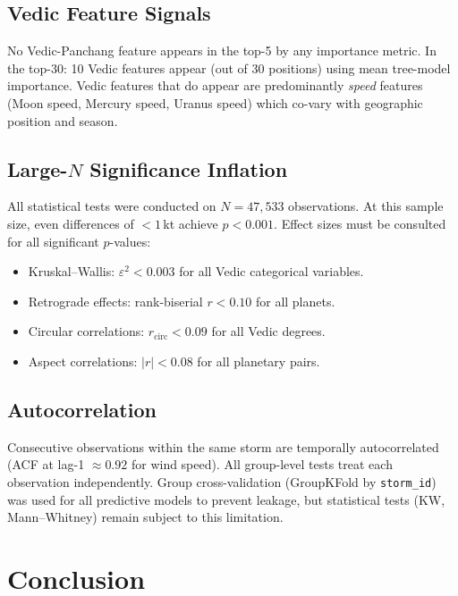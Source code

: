 \documentclass[11pt,a4paper]{article}
\begin{document}
\subsection{Vedic Feature Signals}

No Vedic-Panchang feature appears in the top-5 by any importance metric. In the top-30:
10 Vedic features appear (out of 30 positions)
using mean tree-model importance. Vedic features that do appear are predominantly
\emph{speed} features (Moon speed, Mercury speed, Uranus speed) which co-vary with
geographic position and season.

\subsection{Large-$N$ Significance Inflation}

All statistical tests were conducted on $N = 47,533$ observations.
At this sample size, even differences of $< 1$\,kt achieve $p < 0.001$.
Effect sizes must be consulted for all significant $p$-values:

\begin{itemize}[noitemsep]
  \item Kruskal--Wallis: $\varepsilon^2 < 0.003$ for all Vedic categorical variables.
  \item Retrograde effects: rank-biserial $r < 0.10$ for all planets.
  \item Circular correlations: $r_{\text{circ}} < 0.09$ for all Vedic degrees.
  \item Aspect correlations: $|r| < 0.08$ for all planetary pairs.
\end{itemize}

\subsection{Autocorrelation}

Consecutive observations within the same storm are temporally autocorrelated
(ACF at lag-1 $\approx 0.92$ for wind speed). All group-level tests treat each
observation independently. Group cross-validation (GroupKFold by \texttt{storm\_id}) was
used for all predictive models to prevent leakage, but statistical tests
(KW, Mann--Whitney) remain subject to this limitation.

\section{Conclusion}
\end{document}
